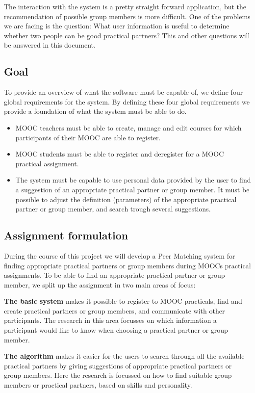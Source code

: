 \documentclass[]{article}
\begin{document}
The interaction with the system is a pretty straight forward application, but the recommendation of possible group members is more difficult.
One of the problems we are facing is the question: What user information is useful to determine whether two people can be good practical partners?
This and other questions will be answered in this document.

\subsection{Goal}
To provide an overview of what the software must be capable of, we define four global requirements for the system.
By defining these four global requirements we provide a foundation of what the system must be able to do.
\begin{itemize}
\item MOOC teachers must be able to create, manage and edit courses for which participants of their MOOC are able to register.

\item MOOC students must be able to register and deregister for a MOOC practical assignment.

\item The system must be capable to use personal data provided by the user to find a suggestion of an appropriate practical partner or group member.
It must be possible to adjust the definition (parameters) of the appropriate practical partner or group member, and search trough several suggestions.
\end{itemize}

\subsection{Assignment formulation}
During the course of this project we will develop a Peer Matching system for finding appropriate practical partners or group members during MOOCs practical assignments.
To be able to find an appropriate practical partner or group member, we split up the assignment in two main areas of focus:

\textbf{The basic system} makes it possible to register to MOOC practicals, find and create practical partners or group members, and communicate with other participants.
The research in this area focusses on which information a participant would like to know when choosing a practical partner or group member.

\textbf{The algorithm} makes it easier for the users to search through all the available practical partners by giving suggestions of appropriate practical partners or group members.
Here the research is focussed on how to find suitable group members or practical partners, based on skills and personality.
\end{document}
